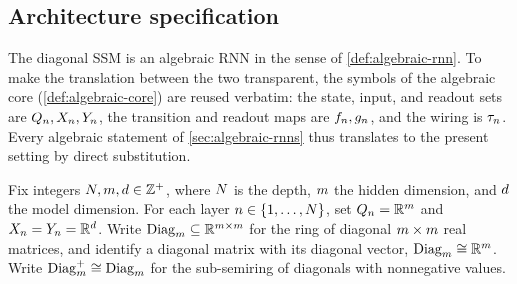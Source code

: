 \documentclass{article}
\begin{document}
\subsection{Architecture specification}\label{sec:ssm-arch}
The diagonal SSM is an algebraic RNN in the sense of \cref{def:algebraic-rnn}.
To make the translation between the two transparent, the symbols of the algebraic core (\cref{def:algebraic-core}) are reused verbatim: the state, input, and readout sets are $Q_n, X_n, Y_n$, the transition and readout maps are $f_n, g_n$, and the wiring is $\tau_n$.
Every algebraic statement of \cref{sec:algebraic-rnns} thus translates to the present setting by direct substitution.

Fix integers $N, m, d \in \mathbb{Z}^{+}$, where $N$ is the depth, $m$ the hidden dimension, and $d$ the model dimension.
For each layer $n \in \{1, \dots, N\}$, set $Q_n = \mathbb{R}^{m}$ and $X_n = Y_n = \mathbb{R}^{d}$.
Write $\mathrm{Diag}_m \subseteq \mathbb{R}^{m \times m}$ for the ring of diagonal $m \times m$ real matrices, and identify a diagonal matrix with its diagonal vector, $\mathrm{Diag}_m \cong \mathbb{R}^{m}$. 
Write $\mathrm{Diag}_m^+ \cong \mathrm{Diag}_m$ for the sub-semiring of diagonals with nonnegative values. 
\end{document}
